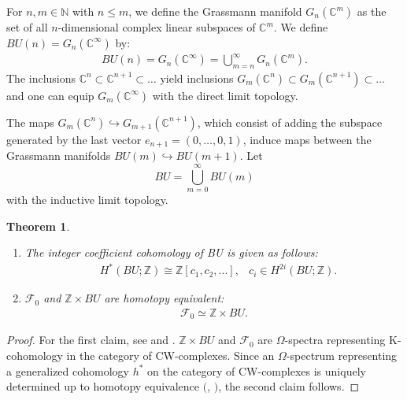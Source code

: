 \documentclass{amsart}
\newtheorem{thm}{Theorem}[section]
\theoremstyle{definition}
\theoremstyle{remark}
\begin{document}
For $n, m \in \mathbb{N}$ with $n \leq m$, we define the Grassmann manifold $G_n(\mathbb{C}^m)$ as the set of all $n$-dimensional complex linear subspaces of $\mathbb{C}^m$. We define $BU(n)=G_n(\mathbb{C}^{ \infty})$ by:
\begin{align*}
BU(n) = G_n(\mathbb{C}^{ \infty}) = \bigcup_{m=n}^{\infty}G_n(\mathbb{C}^m).
\end{align*}
The inclusions \(\mathbb{C}^n \subset \mathbb{C}^{n+1} \subset \dots\) yield inclusions 
\(G_{m}(\mathbb{C}^n) \subset G_{m}(\mathbb{C}^{n+1}) \subset \dots\) and one can equip 
\(G_m(\mathbb{C}^{\infty})\) with the direct limit topology.

The maps \(G_{m}(\mathbb{C}^n) \hookrightarrow G_{m+1}(\mathbb{C}^{n+1})\), 
which consist of adding the subspace generated by the last vector 
\(e_{n+1} = (0, \dots, 0, 1)\), induce maps between the Grassmann manifolds  
\(BU(m) \hookrightarrow BU(m+1)\). Let  
\[
BU = \bigcup_{m=0}^{\infty} BU(m)
\]  
with the inductive limit topology.
\begin{thm}
\begin{enumerate}
\item The integer coefficient cohomology of BU is given as follows:
\begin{align*}
&H^{*}(BU;\mathbb{Z})\cong \mathbb{Z}[c_1,c_2,...], &c_i\in H^{2i}(BU;\mathbb{Z}).
\end{align*}
\item $\mathcal{F}_0$ and $\mathbb{Z} \times BU$ are homotopy equivalent:
\begin{align*}
\mathcal{F}_0 \simeq \mathbb{Z}\times BU.
\end{align*}
\end{enumerate}
\end{thm}

\begin{proof}
For the first claim, see \cite{Milnor} and \cite{Husemoller}. $\mathbb{Z} \times BU$ and $\mathcal{F}_0$ are $\Omega$-spectra representing K-cohomology in the category of CW-complexes. Since an $\Omega$-spectrum representing a generalized cohomology $h^{*}$ on the category of CW-complexes is uniquely determined up to homotopy equivalence $($\cite{Araki}, \cite{Rudyak}$)$, the second claim follows.
\end{proof}
\end{document}
